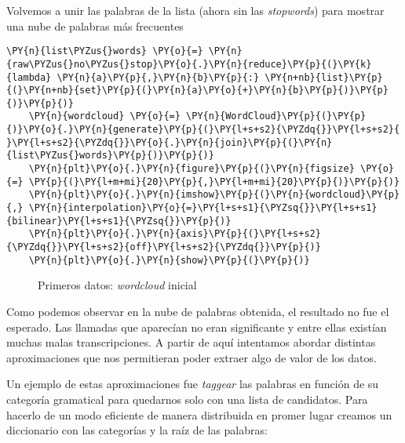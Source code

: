        Volvemos a unir las palabras de la lista (ahora sin las \textit{stopwords}) para mostrar una nube de  palabras más frecuentes
    
        \begin{tcolorbox}[breakable, size=fbox, boxrule=1pt, pad at break*=1mm,colback=cellbackground, colframe=cellborder]
    \begin{Verbatim}[commandchars=\\\{\}]
    \PY{n}{list\PYZus{}words} \PY{o}{=} \PY{n}{raw\PYZus{}no\PYZus{}stop}\PY{o}{.}\PY{n}{reduce}\PY{p}{(}\PY{k}{lambda} \PY{n}{a}\PY{p}{,}\PY{n}{b}\PY{p}{:} \PY{n+nb}{list}\PY{p}{(}\PY{n+nb}{set}\PY{p}{(}\PY{n}{a}\PY{o}{+}\PY{n}{b}\PY{p}{)}\PY{p}{)}\PY{p}{)}  
    \PY{n}{wordcloud} \PY{o}{=} \PY{n}{WordCloud}\PY{p}{(}\PY{p}{)}\PY{o}{.}\PY{n}{generate}\PY{p}{(}\PY{l+s+s2}{\PYZdq{}}\PY{l+s+s2}{ }\PY{l+s+s2}{\PYZdq{}}\PY{o}{.}\PY{n}{join}\PY{p}{(}\PY{n}{list\PYZus{}words}\PY{p}{)}\PY{p}{)}
    \PY{n}{plt}\PY{o}{.}\PY{n}{figure}\PY{p}{(}\PY{n}{figsize} \PY{o}{=} \PY{p}{(}\PY{l+m+mi}{20}\PY{p}{,}\PY{l+m+mi}{20}\PY{p}{)}\PY{p}{)}
    \PY{n}{plt}\PY{o}{.}\PY{n}{imshow}\PY{p}{(}\PY{n}{wordcloud}\PY{p}{,} \PY{n}{interpolation}\PY{o}{=}\PY{l+s+s1}{\PYZsq{}}\PY{l+s+s1}{bilinear}\PY{l+s+s1}{\PYZsq{}}\PY{p}{)}
    \PY{n}{plt}\PY{o}{.}\PY{n}{axis}\PY{p}{(}\PY{l+s+s2}{\PYZdq{}}\PY{l+s+s2}{off}\PY{l+s+s2}{\PYZdq{}}\PY{p}{)}
    \PY{n}{plt}\PY{o}{.}\PY{n}{show}\PY{p}{(}\PY{p}{)}
    \end{Verbatim}
    \end{tcolorbox}
    
      \begin{figure}[!ht]
                    	\centering
                    	\caption{Primeros datos: \textit{wordcloud} inicial}
                    	\label{fig:wordcloudmalo1}
                    \end{figure}
              
              
Como podemos observar en la nube de palabras obtenida, el resultado no fue el esperado. Las llamadas que aparecían no eran significante y entre ellas existían muchas malas  transcripciones. A partir de aquí intentamos abordar distintas aproximaciones que nos permitieran poder extraer algo de valor de los datos.

Un ejemplo de estas aproximaciones fue \textit{taggear} las palabras en  función de su categoría gramatical para quedarnos solo con una lista de candidatos. Para hacerlo de un modo eficiente de manera distribuida en promer lugar creamos un diccionario con las categorías y la raíz de las palabras: 

